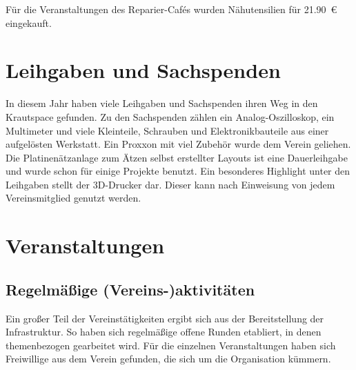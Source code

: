 \documentclass[ngerman]{scrartcl}
\begin{document}
Für die Veranstaltungen des Reparier-Cafés wurden Nähutensilien für \num{21,90}~\euro{} eingekauft.

\section{Leihgaben und Sachspenden}

In diesem Jahr haben viele Leihgaben und Sachspenden ihren Weg in den Krautspace gefunden. 
Zu den Sachspenden zählen ein Analog-Oszilloskop, ein Multimeter und viele Kleinteile, Schrauben und Elektronikbauteile aus einer aufgelösten Werkstatt.
Ein Proxxon mit viel Zubehör wurde dem Verein geliehen.
Die Platinenätzanlage zum Ätzen selbst erstellter Layouts ist eine Dauerleihgabe und wurde schon für einige Projekte benutzt.
Ein besonderes Highlight unter den Leihgaben stellt der 3D-Drucker dar.
Dieser kann nach Einweisung von jedem Vereinsmitglied genutzt werden.

\section{Veranstaltungen}

\subsection{Regelmäßige (Vereins-)aktivitäten}

Ein großer Teil der Vereinstätigkeiten ergibt sich aus der
Bereitstellung der Infrastruktur. So haben sich regelmäßige offene Runden
etabliert, in denen themenbezogen gearbeitet wird. Für die
einzelnen Veranstaltungen haben sich Freiwillige aus dem Verein
gefunden, die sich um die Organisation kümmern.
\end{document}
